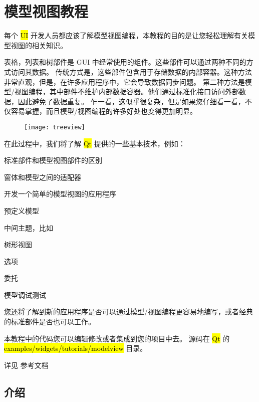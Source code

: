 \chapter{模型视图教程}

每个 \hl{UI} 开发人员都应该了解模型视图编程，本教程的目的是让您轻松理解有关模型视图的相关知识。

表格，列表和树部件是 GUI 中经常使用的组件。这些部件可以通过两种不同的方式访问其数据。
传统方式是，这些部件包含用于存储数据的内部容器。这种方法非常直观，但是，在许多应用程序中，它会导致数据同步问题。
第二种方法是模型/视图编程，其中部件不维护内部数据容器。他们通过标准化接口访问外部数据，因此避免了数据重复。
乍一看，这似乎很复杂，但是如果您仔细看一看，不仅容易掌握，而且模型/视图编程的许多好处也变得更加明显。

\begin{figure}[hbt!]  
\texttt{[image: treeview]}
\end{figure}

在此过程中，我们将了解 \hl{Qt} 提供的一些基本技术，例如：

\begin{compactitem}
\item 标准部件和模型视图部件的区别
\item 窗体和模型之间的适配器
\item 开发一个简单的模型视图的应用程序
\item 预定义模型

\end{compactitem}

中间主题，比如

\begin{compactitem}
\item 树形视图
\item 选项
\item 委托
\item 模型调试测试
\end{compactitem}

您还将了解到新的应用程序是否可以通过模型/视图编程更容易地编写，或者经典的标准部件是否也可以工作。

本教程中的代码您可以编辑修改或者集成到您的项目中去。 源码在 \hl{Qt} 的 \hl{examples/widgets/tutorials/modelview} 目录。

详见 参考文档

\section{介绍}

